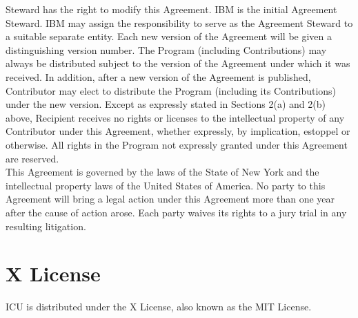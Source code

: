 {Steward has the right to modify this Agreement. IBM is the initial
Agreement Steward. IBM may assign the responsibility to serve as the
Agreement Steward to a suitable separate entity. Each new version of
the Agreement will be given a distinguishing version number. The
Program (including Contributions) may always be distributed subject to
the version of the Agreement under which it was received. In addition,
after a new version of the Agreement is published, Contributor may
elect to distribute the Program (including its Contributions) under
the new version. Except as expressly stated in Sections 2(a) and 2(b)
above, Recipient receives no rights or licenses to the intellectual
property of any Contributor under this Agreement, whether expressly,
by implication, estoppel or otherwise. All rights in the Program not
expressly granted under this Agreement are reserved.
\\[4pt]
This Agreement is governed by the laws of the State of New York and
the intellectual property laws of the United States of America. No
party to this Agreement will bring a legal action under this Agreement
more than one year after the cause of action arose. Each party waives
its rights to a jury trial in any resulting litigation.
}


\section{X License}\label{section:x-license}

\setlength{\baselineskip}{\oldbaselineskip}
\noindent
ICU is distributed under the X License, also known as the MIT License.
\\

